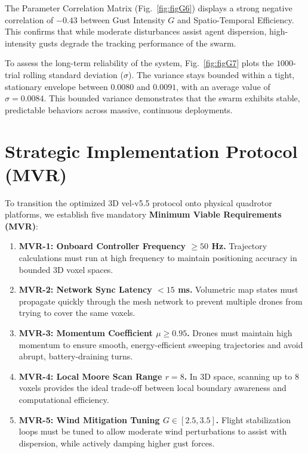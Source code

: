 \documentclass[letterpaper, 10pt, conference]{IEEEtran}
\begin{document}
The Parameter Correlation Matrix (Fig.~\ref{fig:figG6}) displays a strong negative correlation of \textbf{$-0.43$} between Gust Intensity $G$ and Spatio-Temporal Efficiency. This confirms that while moderate disturbances assist agent dispersion, high-intensity gusts degrade the tracking performance of the swarm.

To assess the long-term reliability of the system, Fig.~\ref{fig:figG7} plots the $1000$-trial rolling standard deviation ($\sigma$). The variance stays bounded within a tight, stationary envelope between $0.0080$ and $0.0091$, with an average value of \textbf{$\sigma = 0.0084$}. This bounded variance demonstrates that the swarm exhibits stable, predictable behaviors across massive, continuous deployments.

\section{Strategic Implementation Protocol (MVR)}
\label{sec:mvr}

To transition the optimized 3D vel-v5.5 protocol onto physical quadrotor platforms, we establish five mandatory \textbf{Minimum Viable Requirements (MVR)}:

\begin{enumerate}
    \item \textbf{MVR-1: Onboard Controller Frequency $\geq 50$ Hz.} Trajectory calculations must run at high frequency to maintain positioning accuracy in bounded 3D voxel spaces.
    \item \textbf{MVR-2: Network Sync Latency $< 15$ ms.} Volumetric map states must propagate quickly through the mesh network to prevent multiple drones from trying to cover the same voxels.
    \item \textbf{MVR-3: Momentum Coefficient $\mu \geq 0.95$.} Drones must maintain high momentum to ensure smooth, energy-efficient sweeping trajectories and avoid abrupt, battery-draining turns.
    \item \textbf{MVR-4: Local Moore Scan Range $r = 8$.} In 3D space, scanning up to $8$ voxels provides the ideal trade-off between local boundary awareness and computational efficiency.
    \item \textbf{MVR-5: Wind Mitigation Tuning $G \in [2.5, 3.5]$.} Flight stabilization loops must be tuned to allow moderate wind perturbations to assist with dispersion, while actively damping higher gust forces.
\end{enumerate}
\end{document}
